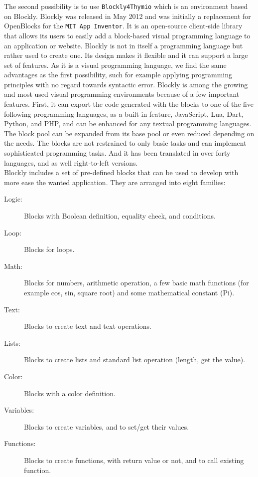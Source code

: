 \documentclass{scrartcl}
\begin{document}
The second possibility is to use \texttt{Blockly4Thymio} which is an environment based on Blockly. Blockly was released in May 2012 and was initially a replacement for OpenBlocks for the \texttt{MIT App Inventor}. 
It is an open-source client-side library that allows its users to easily add a block-based visual programming language to an application or website. 
Blockly is not in itself a programming language but rather used to create one. Its design makes it flexible and it can support a large set of features. 
As it is a visual programming language, we find the same advantages as the first possibility, such for example applying programming principles with no regard towards syntactic error.
Blockly is among the growing and most used visual programming environments because of a few important features. First, it can export the code generated with the blocks to one of the five following programming languages, 
as a built-in feature, JavaScript, Lua, Dart, Python, and PHP, and can be enhanced for any textual programming languages. 
The block pool can be expanded from its base pool or even reduced depending on the needs. The blocks are not restrained to only basic tasks and can implement sophisticated programming tasks. 
And it has been translated in over forty languages, and as well right-to-left versions. \\

Blockly includes a set of pre-defined blocks that can be used to develop with more ease the wanted application. They are arranged into eight families:
\begin{description}
  \item [Logic:] Blocks with Boolean definition, equality check, and conditions.
  \item [Loop:] Blocks for loops.
  \item [Math:] Blocks for numbers, arithmetic operation, a few basic math functions (for example cos, sin, square root) and some mathematical constant (Pi).
  \item [Text:] Blocks to create text and text operations.
  \item [Lists:] Blocks to create lists and standard list operation (length, get the value).
  \item [Color:] Blocks with a color definition.
  \item [Variables:] Blocks to create variables, and to set/get their values.
  \item [Functions:] Blocks to create functions, with return value or not, and to call existing function.
\end{description}
\end{document}
